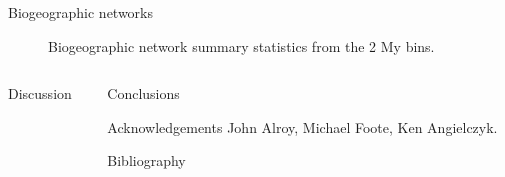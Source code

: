 \documentclass[final]{beamer}\usepackage[]{graphicx}\usepackage[]{color}
\newlength{\onecolwid}
\newlength{\twocolwid}
\begin{document}
\begin{frame}[t]
\begin{columns}
\begin{column}{\twocolwid}
\begin{alertblock}{Biogeographic networks}
\begin{figure}[ht]
\begin{center}
\begin{subfigure}[b]{\onecolwid}
              \label{fig:net_loco}
            \end{subfigure}
          \end{center}
          \caption{Biogeographic network summary statistics from the 2 My bins.}
          \label{fig:net_sum}
        \end{figure}
      \end{alertblock}

      \begin{columns}[t,totalwidth = \twocolwid]
        \begin{column}{\onecolwid}
          \begin{block}{Discussion}

          \end{block}
        \end{column}

        \begin{column}{\onecolwid}
          \begin{block}{Conclusions}
           
          \end{block}

          \begin{block}{Acknowledgements}
            John Alroy, Michael Foote, Ken Angielczyk.
          \end{block}

          \begin{scriptsize}
            \begin{block}{Bibliography}
              
              
            \end{block}
          \end{scriptsize}
        \end{column}
      \end{columns}
    \end{column}
  \end{columns}
\end{frame}
\end{document}
